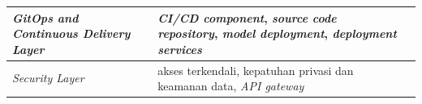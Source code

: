 \begin{table}[H]
\begin{tabular}{|>{\raggedright\arraybackslash}m{3.4cm}|>{\raggedright\arraybackslash}m{6.35cm}|>{\raggedright\arraybackslash}m{3.5cm}|}
\hline
\textit{GitOps and Continuous Delivery Layer} & \textit{CI/CD component}, \textit{source code repository}, \textit{model deployment}, \textit{deployment services} & \autocite{kreuzberger2023mlops,googlecloud2024mlops,najafabadi2024analysis} \\
\hline
\textit{Security Layer} & akses terkendali, kepatuhan privasi dan keamanan data, \textit{API gateway} & \autocite{munappy2020adhoc,rella2022mlops,najafabadi2024analysis} \\
\hline
\end{tabular}
\end{table}
